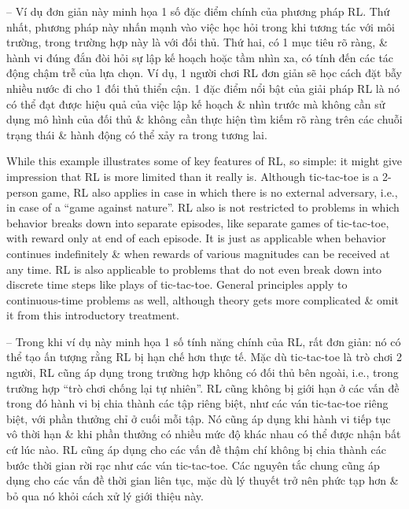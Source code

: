 \documentclass{article}
\begin{document}
\begin{itemize}
\begin{itemize}
        -- Ví dụ đơn giản này minh họa 1 số đặc điểm chính của phương pháp RL. Thứ nhất, phương pháp này nhấn mạnh vào việc học hỏi trong khi tương tác với môi trường, trong trường hợp này là với đối thủ. Thứ hai, có 1 mục tiêu rõ ràng, \& hành vi đúng đắn đòi hỏi sự lập kế hoạch hoặc tầm nhìn xa, có tính đến các tác động chậm trễ của lựa chọn. Ví dụ, 1 người chơi RL đơn giản sẽ học cách đặt bẫy nhiều nước đi cho 1 đối thủ thiển cận. 1 đặc điểm nổi bật của giải pháp RL là nó có thể đạt được hiệu quả của việc lập kế hoạch \& nhìn trước mà không cần sử dụng mô hình của đối thủ \& không cần thực hiện tìm kiếm rõ ràng trên các chuỗi trạng thái \& hành động có thể xảy ra trong tương lai.

        While this example illustrates some of key features of RL, so simple: it might give impression that RL is more limited than it really is. Although tic-tac-toe is a 2-person game, RL also applies in case in which there is no external adversary, i.e., in case of a ``game against nature''. RL also is not restricted to problems in which behavior breaks down into separate episodes, like separate games of tic-tac-toe, with reward only at end of each episode. It is just as applicable when behavior continues indefinitely \& when rewards of various magnitudes can be received at any time. RL is also applicable to problems that do not even break down into discrete time steps like plays of tic-tac-toe. General principles apply to continuous-time problems as well, although theory gets more complicated \& omit it from this introductory treatment.

        -- Trong khi ví dụ này minh họa 1 số tính năng chính của RL, rất đơn giản: nó có thể tạo ấn tượng rằng RL bị hạn chế hơn thực tế. Mặc dù tic-tac-toe là trò chơi 2 người, RL cũng áp dụng trong trường hợp không có đối thủ bên ngoài, i.e., trong trường hợp ``trò chơi chống lại tự nhiên''. RL cũng không bị giới hạn ở các vấn đề trong đó hành vi bị chia thành các tập riêng biệt, như các ván tic-tac-toe riêng biệt, với phần thưởng chỉ ở cuối mỗi tập. Nó cũng áp dụng khi hành vi tiếp tục vô thời hạn \& khi phần thưởng có nhiều mức độ khác nhau có thể được nhận bất cứ lúc nào. RL cũng áp dụng cho các vấn đề thậm chí không bị chia thành các bước thời gian rời rạc như các ván tic-tac-toe. Các nguyên tắc chung cũng áp dụng cho các vấn đề thời gian liên tục, mặc dù lý thuyết trở nên phức tạp hơn \& bỏ qua nó khỏi cách xử lý giới thiệu này.


\end{itemize}
\end{itemize}
\end{document}
